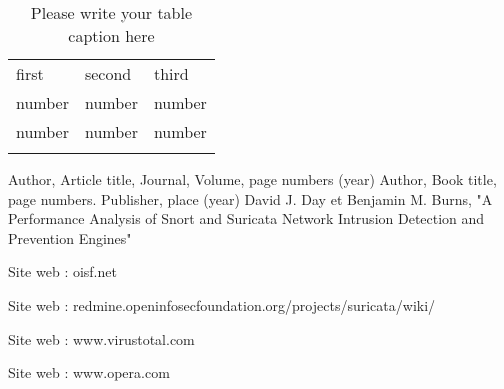 \documentclass[smallextended]{svjour3}       %
\begin{document}
\begin{table}
\caption{Please write your table caption here}
\label{tab:1}       %
\begin{tabular}{lll}
\hline\noalign{\smallskip}
first & second & third  \\
\noalign{\smallskip}\hline\noalign{\smallskip}
number & number & number \\
number & number & number \\
\noalign{\smallskip}\hline
\end{tabular}
\end{table}




\begin{thebibliography}{}
%
%
Author, Article title, Journal, Volume, page numbers (year)
Author, Book title, page numbers. Publisher, place (year)
David J. Day et Benjamin M. Burns, "A Performance Analysis of Snort and Suricata Network Intrusion Detection and Prevention Engines"

Site web : oisf.net

Site web : redmine.openinfosecfoundation.org/projects/suricata/wiki/

Site web : www.virustotal.com

Site web : www.opera.com


\end{thebibliography}
\end{document}
